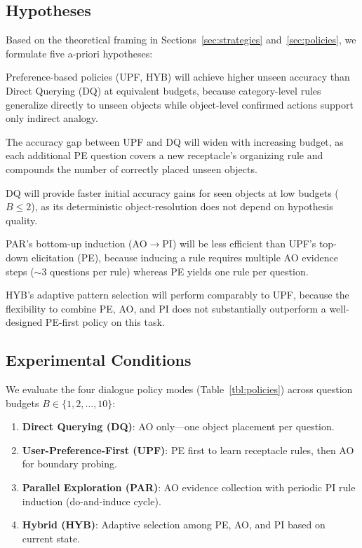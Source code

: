 \documentclass[a4paper,fleqn]{cas-sc}
\begin{document}
\subsection{Hypotheses}

Based on the theoretical framing in Sections~\ref{sec:strategies} and~\ref{sec:policies}, we formulate five a-priori hypotheses:

\begin{description}[leftmargin=*]
    \item[\textbf{H1}] Preference-based policies (UPF, HYB) will achieve higher unseen accuracy than Direct Querying (DQ) at equivalent budgets, because category-level rules generalize directly to unseen objects while object-level confirmed actions support only indirect analogy.
    \item[\textbf{H2}] The accuracy gap between UPF and DQ will widen with increasing budget, as each additional PE question covers a new receptacle's organizing rule and compounds the number of correctly placed unseen objects.
    \item[\textbf{H3}] DQ will provide faster initial accuracy gains for seen objects at low budgets ($B \leq 2$), as its deterministic object-resolution does not depend on hypothesis quality.
    \item[\textbf{H4}] PAR's bottom-up induction (AO$\to$PI) will be less efficient than UPF's top-down elicitation (PE), because inducing a rule requires multiple AO evidence steps ($\sim$3 questions per rule) whereas PE yields one rule per question.
    \item[\textbf{H5}] HYB's adaptive pattern selection will perform comparably to UPF, because the flexibility to combine PE, AO, and PI does not substantially outperform a well-designed PE-first policy on this task.
\end{description}

\subsection{Experimental Conditions}

We evaluate the four dialogue policy modes (Table~\ref{tbl:policies}) across question budgets $B \in \{1, 2, \ldots, 10\}$:

\begin{enumerate}[leftmargin=*]
    \item \textbf{Direct Querying (DQ)}: AO only---one object placement per question.
    \item \textbf{User-Preference-First (UPF)}: PE first to learn receptacle rules, then AO for boundary probing.
    \item \textbf{Parallel Exploration (PAR)}: AO evidence collection with periodic PI rule induction (do-and-induce cycle).
    \item \textbf{Hybrid (HYB)}: Adaptive selection among PE, AO, and PI based on current state.
\end{enumerate}
\end{document}
